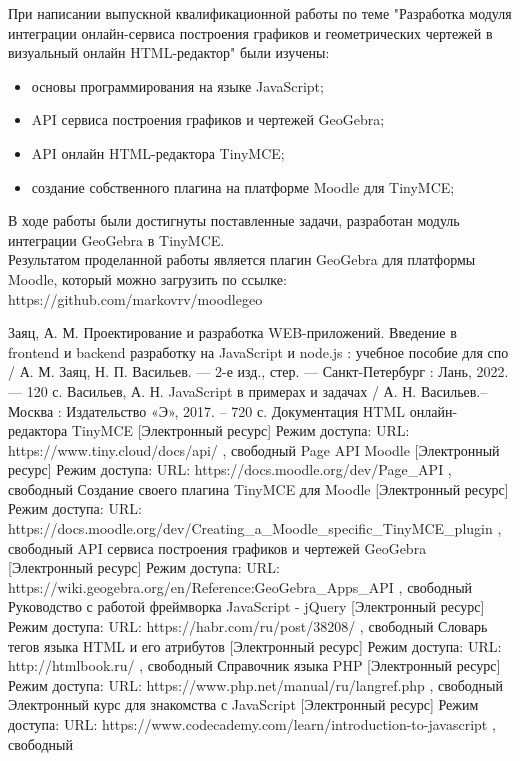 \documentclass[14pt,Diplom]{diplomwork}
\begin{document}
При написании выпускной квалификационной работы по теме "Разработка модуля интеграции онлайн-сервиса построения графиков и геометрических чертежей в визуальный онлайн HTML-редактор" были изучены:
\begin{itemize}
	\item основы программирования на языке JavaScript;
	\item API сервиса построения графиков и чертежей GeoGebra;
	\item API онлайн HTML-редактора TinyMCE;
	\item создание собственного плагина на платформе Moodle для TinyMCE;
\end{itemize}
В ходе работы были достигнуты поставленные задачи, разработан модуль интеграции GeoGebra в TinyMCE.\\
Результатом проделанной работы является плагин GeoGebra для платформы Moodle, который можно загрузить по ссылке: https://github.com/markovrv/moodlegeo


\begin{thebibliography}{99}
 Заяц, А. М. Проектирование и разработка WEB-приложений. Введение в frontend и backend разработку на JavaScript и node.js : учебное пособие для спо / А. М. Заяц, Н. П. Васильев. — 2-е изд., стер. — Санкт-Петербург : Лань, 2022. — 120 с. 
 Васильев, А. Н. JavaScript в примерах и задачах / А. Н. Васильев.– Москва :
Издательство «Э», 2017. – 720 с.	
 Документация HTML онлайн-редактора TinyMCE [Электронный ресурс] Режим доступа: URL: https://www.tiny.cloud/docs/api/ , свободный
 Page API Moodle [Электронный ресурс] Режим доступа: URL: https://docs.moodle.org/dev/Page\_API , свободный
 Создание своего плагина TinyMCE для Moodle  [Электронный ресурс] Режим доступа: URL: https://docs.moodle.org/dev/Creating\_a\_Moodle\_specific\_TinyMCE\_plugin , свободный
 API сервиса построения графиков и чертежей GeoGebra [Электронный ресурс] Режим доступа: URL: https://wiki.geogebra.org/en/Reference:GeoGebra\_Apps\_API , свободный
 Руководство с работой фреймворка JavaScript - jQuery [Электронный ресурс] Режим доступа: URL: https://habr.com/ru/post/38208/ , свободный
 Словарь тегов языка HTML и его атрибутов [Электронный ресурс] Режим доступа: URL: http://htmlbook.ru/ , свободный
 Справочник языка PHP [Электронный ресурс] Режим доступа: URL: https://www.php.net/manual/ru/langref.php	 , свободный
 Электронный курс для знакомства с JavaScript [Электронный ресурс] Режим доступа: URL: https://www.codecademy.com/learn/introduction-to-javascript	 , свободный
\end{thebibliography}

 
\end{document}
